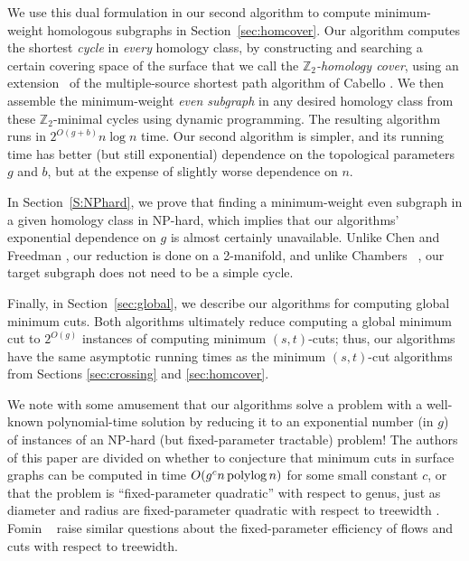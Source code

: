 \documentclass[letterpaper,review]{siamart190516}
\def\Z{\mathbb{Z}}
\begin{document}
We use this dual formulation in our second algorithm to compute minimum-weight homologous subgraphs in Section~\ref{sec:homcover}.  Our algorithm computes the shortest \emph{cycle}
in \emph{every} homology class, by constructing and searching a certain covering space of the surface that we call the \emph{$\Z_2$-homology cover}, using an extension~\cite{efl-hmcpf-18} of the multiple-source shortest path algorithm of Cabello \etal \cite{cce-msspe-13}.  We then assemble the minimum-weight \emph{even subgraph} in any desired homology class from these $\Z_2$-minimal cycles using dynamic programming.  The resulting algorithm runs in $2^{O(g+b)}n\log n$ time.  Our second algorithm is simpler, and its running time has better (but still exponential) dependence on the topological parameters $g$ and $b$, but at the expense of slightly worse dependence on $n$.

In Section~\ref{S:NPhard}, we prove that finding a minimum-weight even subgraph in a given homology class in NP-hard, which implies that our algorithms' exponential dependence on $g$ is almost certainly unavailable.  Unlike Chen and Freedman \cite{cf-hrhl-10}, our reduction is done on a 2-manifold, and unlike Chambers \etal~\cite{ccelw-scsih-08}, our target subgraph does not need to be a simple cycle.

Finally, in Section~\ref{sec:global}, we describe our algorithms for computing global minimum cuts.  Both algorithms ultimately reduce computing a global minimum cut to  $2^{O(g)}$ instances of computing minimum $(s,t)$-cuts; thus, our algorithms have the same asymptotic running times as the minimum $(s,t)$-cut algorithms from Sections \ref{sec:crossing} and \ref{sec:homcover}.

We note with some amusement that our algorithms solve a problem with a well-known polynomial-time solution by reducing it to an exponential number (in $g$) of instances of an NP-hard (but fixed-parameter tractable) problem!  
The authors of this paper are divided on whether to conjecture that minimum cuts in surface graphs can  be computed in time $O(g^c n\operatorname{polylog} n)$ for some small constant $c$, or that the problem is “fixed-parameter quadratic” with respect to genus, just as diameter and radius are fixed-parameter quadratic with respect to treewidth \cite{aww-afpsa-16}.  
Fomin \etal~\cite{flspw-fppcg-18} raise similar questions about the fixed-parameter efficiency of flows and cuts with respect to treewidth.


\end{document}
